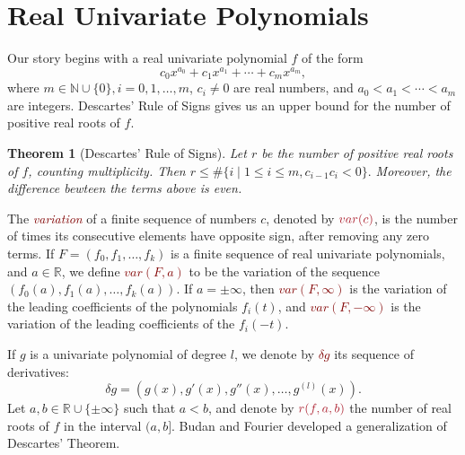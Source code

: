 \documentclass[12pt]{amsart}
\newtheorem{theorem}{Theorem}
\newtheorem{corollary}[theorem]{Corollary}
\theoremstyle{definition}
\newcommand{\RR}{\mathbb{R}}
\newcommand{\NN}{\mathbb{N}}
\begin{document}
\section{Real Univariate Polynomials}

Our story begins with a real univariate polynomial $f$ of the form $$c_{0}x^{a_{0}} + c_{1}x^{a_{1}} + \cdots + c_{m}x^{a_{m}},$$ where $m\in \NN\cup\{0\}, i=0,1,\dots, m$, $c_{i} \neq 0$ are real numbers, and $a_{0} < a_{1} < \cdots < a_{m}$ are integers. Descartes' Rule of Signs \cite{MR2830310} gives us an upper bound for the number of positive real roots of $f$.

\begin{theorem}[Descartes' Rule of Signs]Let $r$ be the number of positive real roots of $f$, counting multiplicity. Then $r\leq \#\{i\mid1\leq i\leq m, c_{i-1}c_{i}<0\}.$ Moreover, the difference bewteen the terms above is even.\end{theorem}




The \textit{\textcolor{Maroon}{variation}} of a finite sequence of numbers $c$, denoted by $\textcolor{Maroon}{var(c)}$, is the number of times its consecutive elements have opposite sign, after removing any zero terms. If $F=(f_{0},f_{1},\dots,f_{k})$ is a finite sequence of real univariate polynomials, and $a\in \RR$, we define \textcolor{Maroon}{$var(F,a)$} to be the variation of the sequence $(f_{0}(a),f_{1}(a),\dots,f_{k}(a))$. If $a=\pm\infty$, then \textcolor{Maroon}{$var(F,\infty)$} is the variation of the leading coefficients of the polynomials $f_{i}(t)$, and \textcolor{Maroon}{$var(F,-\infty)$} is the variation of the leading coefficients of the $f_{i}(-t)$.


If $g$ is a univariate polynomial of degree $l$, we denote by \textcolor{Maroon}{$\delta g$} its sequence of derivatives: $$\delta g = \left(g(x),g'(x),g''(x),\dots,g^{(l)}(x)\right).$$ Let $a,b\in \RR\cup\{\pm \infty\}$ such that $a<b$, and denote by $\textcolor{Maroon}{r(f,a,b)}$ the number of real roots of $f$ in the interval $(a,b]$. Budan and Fourier \cite{MR2830310} developed a generalization of Descartes' Theorem.
\end{document}
